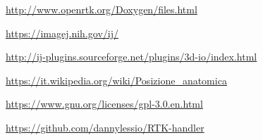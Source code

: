 \documentclass[a4paper,12pt, doubleside]{report}
\begin{document}
\begin{thebibliography}{1}
        \url{http://www.openrtk.org/Doxygen/files.html}
    
        \url{https://imagej.nih.gov/ij/}
        
        \url{http://ij-plugins.sourceforge.net/plugins/3d-io/index.html}
        
        \url{https://it.wikipedia.org/wiki/Posizione_anatomica}



        \url{https://www.gnu.org/licenses/gpl-3.0.en.html}

        \url{https://github.com/dannylessio/RTK-handler}


    
        
    \end{thebibliography}
\end{document}
